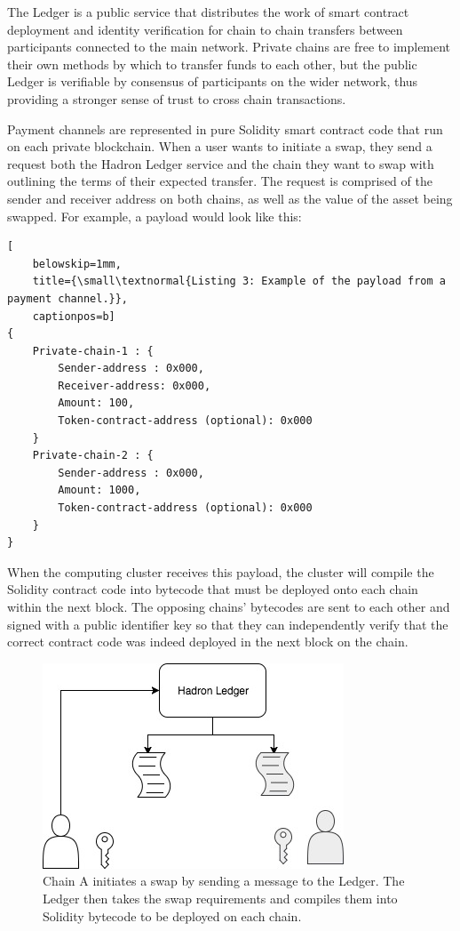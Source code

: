 \documentclass{%
	article}
\begin{document}
The Ledger is a public service that distributes the work of smart contract deployment and identity verification for chain to chain transfers between participants connected to the main network. Private chains are free to implement their own methods by which to transfer funds to each other, but the public Ledger is verifiable by consensus of participants on the wider network, thus providing a stronger sense of trust to cross chain transactions.

Payment channels are represented in pure Solidity smart contract code that run on each private blockchain. When a user wants to initiate a swap, they send a request both the Hadron Ledger service and the chain they want to swap with outlining the terms of their expected transfer. The request is comprised of the sender and receiver address on both chains, as well as the value of the asset being swapped. For example, a payload would look like this:

\begin{lstlisting}[
	belowskip=1mm,
	title={\small\textnormal{Listing 3: Example of the payload from a payment channel.}},
	captionpos=b]
{
    Private-chain-1 : {
        Sender-address : 0x000,
        Receiver-address: 0x000,
        Amount: 100,
        Token-contract-address (optional): 0x000
    }
    Private-chain-2 : {
        Sender-address : 0x000,
        Amount: 1000,
        Token-contract-address (optional): 0x000
    }
}
\end{lstlisting}

When the computing cluster receives this payload, the cluster will compile the Solidity contract code into bytecode that must be deployed onto each chain within the next block. The opposing chains’ bytecodes are sent to each other and signed with a public identifier key so that they can independently verify that the correct contract code was indeed deployed in the next block on the chain.

\begin{figure}[H]
\centering
\includegraphics[scale=0.45]{fig1.jpg}
\caption{\small\textnormal{Chain A initiates a swap by sending a message to the Ledger. The Ledger then takes the swap requirements and compiles them into Solidity bytecode to be deployed on each chain.}}
\end{figure}
\end{document}
